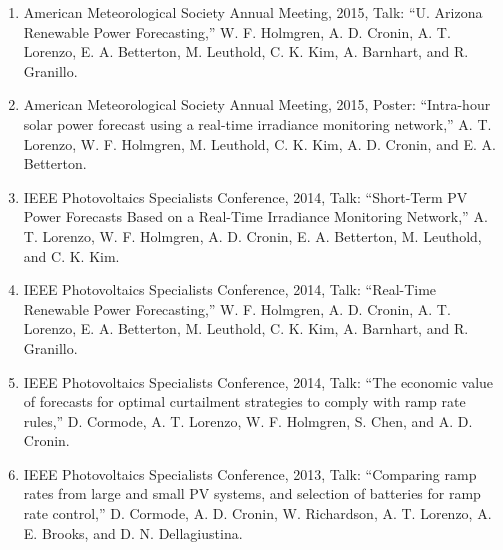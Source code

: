 \begin{enumerate}
\item American Meteorological Society Annual Meeting, 2015, Talk:
  ``U. Arizona Renewable Power Forecasting,''
  W. F. Holmgren, A. D. Cronin, A. T. Lorenzo, E. A. Betterton,
  M. Leuthold, C. K. Kim, A. Barnhart, and R. Granillo.

\item American Meteorological Society Annual Meeting, 2015, Poster:
  ``Intra-hour solar power forecast using a real-time irradiance
  monitoring network,''
  A. T. Lorenzo, W. F. Holmgren, M. Leuthold, C. K. Kim, A. D. Cronin,
  and E. A. Betterton.

\item IEEE Photovoltaics Specialists Conference, 2014, Talk:
  ``Short-Term PV Power Forecasts Based on a Real-Time Irradiance
  Monitoring Network,''
  A. T. Lorenzo, W. F. Holmgren, A. D. Cronin, E. A. Betterton,
  M. Leuthold, and C. K. Kim.

\item IEEE Photovoltaics Specialists Conference, 2014, Talk:
  ``Real-Time Renewable Power Forecasting,''
  W. F. Holmgren, A. D. Cronin, A. T. Lorenzo, E. A. Betterton,
  M. Leuthold, C. K. Kim, A. Barnhart, and R. Granillo.

\item IEEE Photovoltaics Specialists Conference, 2014, Talk:
  ``The economic value of forecasts for optimal curtailment strategies
  to comply with ramp rate rules,''
  D. Cormode, A. T. Lorenzo, W. F. Holmgren, S. Chen, and
  A. D. Cronin.

\item IEEE Photovoltaics Specialists Conference, 2013, Talk:
  ``Comparing ramp rates from large and small PV systems, and
  selection of batteries for ramp rate control,''
  D. Cormode, A. D. Cronin, W. Richardson, A. T. Lorenzo,
  A. E. Brooks, and D. N. Dellagiustina.

\end{enumerate}



